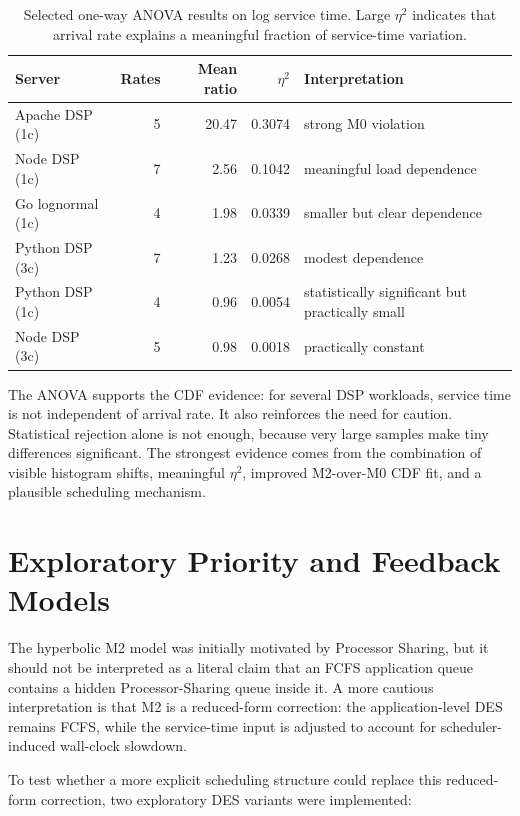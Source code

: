 \begin{table}[h]
\centering
\caption{Selected one-way ANOVA results on log service time. Large $\eta^2$ indicates that arrival rate explains a meaningful fraction of service-time variation.}
\label{tab:anova}
\begin{tabular}{l r r r l}
\toprule
\textbf{Server} & \textbf{Rates} & \textbf{Mean ratio} & \textbf{$\eta^2$} & \textbf{Interpretation} \\
\midrule
Apache DSP (1c) & 5 & 20.47 & 0.3074 & strong M0 violation \\
Node DSP (1c) & 7 & 2.56 & 0.1042 & meaningful load dependence \\
Go lognormal (1c) & 4 & 1.98 & 0.0339 & smaller but clear dependence \\
Python DSP (3c) & 7 & 1.23 & 0.0268 & modest dependence \\
Python DSP (1c) & 4 & 0.96 & 0.0054 & statistically significant but practically small \\
Node DSP (3c) & 5 & 0.98 & 0.0018 & practically constant \\
\bottomrule
\end{tabular}
\end{table}

The ANOVA supports the CDF evidence: for several DSP workloads, service time is not independent of arrival rate. It also reinforces the need for caution. Statistical rejection alone is not enough, because very large samples make tiny differences significant. The strongest evidence comes from the combination of visible histogram shifts, meaningful $\eta^2$, improved M2-over-M0 CDF fit, and a plausible scheduling mechanism.

\section{Exploratory Priority and Feedback Models}
\label{sec:priority-exploratory}

The hyperbolic M2 model was initially motivated by Processor Sharing, but it should not be interpreted as a literal claim that an FCFS application queue contains a hidden Processor-Sharing queue inside it. A more cautious interpretation is that M2 is a reduced-form correction: the application-level DES remains FCFS, while the service-time input is adjusted to account for scheduler-induced wall-clock slowdown.

To test whether a more explicit scheduling structure could replace this reduced-form correction, two exploratory DES variants were implemented:

